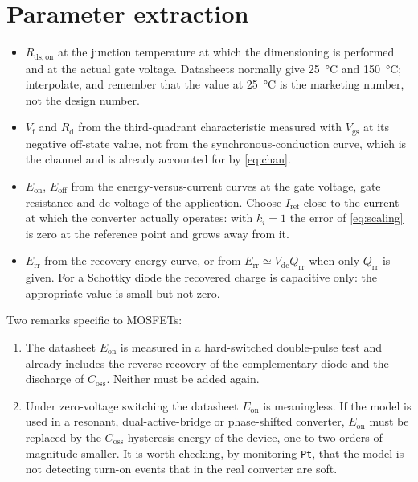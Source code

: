 \documentclass[11pt,a4paper]{article}
\newcommand{\Rdson}{R_\mathrm{ds,on}}
\newcommand{\Eon}{E_\mathrm{on}}
\newcommand{\Eoff}{E_\mathrm{off}}
\newcommand{\Err}{E_\mathrm{rr}}
\begin{document}
\section{Parameter extraction}

\begin{itemize}
\item $\Rdson$ at the junction temperature at which the dimensioning is
      performed and at the actual gate voltage. Datasheets normally give
      \SI{25}{\celsius} and \SI{150}{\celsius}; interpolate, and remember that
      the value at \SI{25}{\celsius} is the marketing number, not the design
      number.
\item $V_\mathrm{f}$ and $R_\mathrm{d}$ from the third-quadrant characteristic
      measured with $V_\mathrm{gs}$ at its negative off-state value, not from
      the synchronous-conduction curve, which is the channel and is already
      accounted for by \eqref{eq:chan}.
\item $\Eon$, $\Eoff$ from the energy-versus-current curves at the gate voltage,
      gate resistance and dc voltage of the application. Choose
      $I_\mathrm{ref}$ close to the current at which the converter actually
      operates: with $k_i = 1$ the error of \eqref{eq:scaling} is zero at the
      reference point and grows away from it.
\item $\Err$ from the recovery-energy curve, or from
      $\Err \simeq V_\mathrm{dc} Q_\mathrm{rr}$ when only $Q_\mathrm{rr}$ is
      given. For a Schottky diode the recovered charge is capacitive only: the
      appropriate value is small but not zero.
\end{itemize}

Two remarks specific to MOSFETs:

\begin{enumerate}
\item The datasheet $\Eon$ is measured in a hard-switched double-pulse test and
      already includes the reverse recovery of the complementary diode and the
      discharge of $C_\mathrm{oss}$. Neither must be added again.
\item Under zero-voltage switching the datasheet $\Eon$ is meaningless. If the
      model is used in a resonant, dual-active-bridge or phase-shifted
      converter, $\Eon$ must be replaced by the $C_\mathrm{oss}$ hysteresis
      energy of the device, one to two orders of magnitude smaller. It is worth
      checking, by monitoring \texttt{Pt}, that the model is not detecting
      turn-on events that in the real converter are soft.
\end{enumerate}
\end{document}
